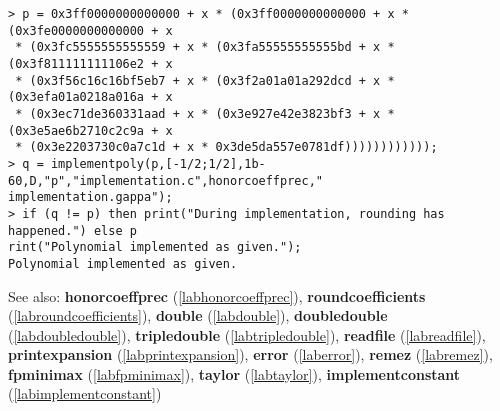 \begin{center}\begin{minipage}{15cm}\begin{Verbatim}[frame=single]
> p = 0x3ff0000000000000 + x * (0x3ff0000000000000 + x * (0x3fe0000000000000 + x
 * (0x3fc5555555555559 + x * (0x3fa55555555555bd + x * (0x3f811111111106e2 + x
 * (0x3f56c16c16bf5eb7 + x * (0x3f2a01a01a292dcd + x * (0x3efa01a0218a016a + x
 * (0x3ec71de360331aad + x * (0x3e927e42e3823bf3 + x * (0x3e5ae6b2710c2c9a + x
 * (0x3e2203730c0a7c1d + x * 0x3de5da557e0781df))))))))))));
> q = implementpoly(p,[-1/2;1/2],1b-60,D,"p","implementation.c",honorcoeffprec,"
implementation.gappa");
> if (q != p) then print("During implementation, rounding has happened.") else p
rint("Polynomial implemented as given.");    
Polynomial implemented as given.
\end{Verbatim}
\end{minipage}\end{center}
See also: \textbf{honorcoeffprec} (\ref{labhonorcoeffprec}), \textbf{roundcoefficients} (\ref{labroundcoefficients}), \textbf{double} (\ref{labdouble}), \textbf{doubledouble} (\ref{labdoubledouble}), \textbf{tripledouble} (\ref{labtripledouble}), \textbf{readfile} (\ref{labreadfile}), \textbf{printexpansion} (\ref{labprintexpansion}), \textbf{error} (\ref{laberror}), \textbf{remez} (\ref{labremez}), \textbf{fpminimax} (\ref{labfpminimax}), \textbf{taylor} (\ref{labtaylor}), \textbf{implementconstant} (\ref{labimplementconstant})
